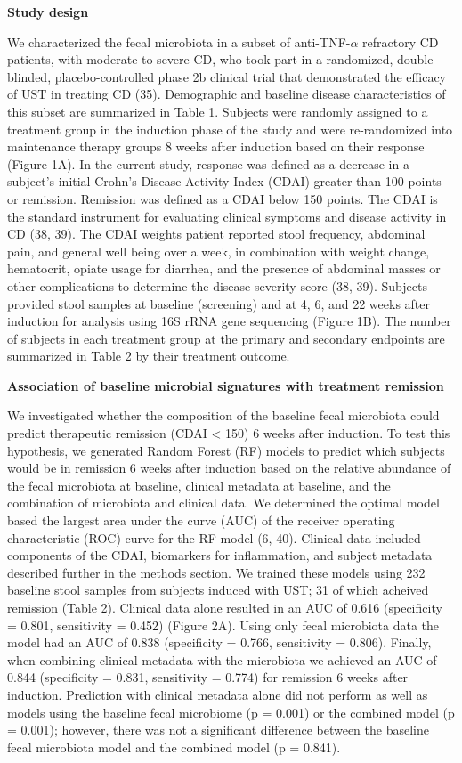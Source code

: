 \documentclass[12pt,]{article}
\begin{document}
\textbf{Study design}

We characterized the fecal microbiota in a subset of
anti-TNF-\({\alpha}\) refractory CD patients, with moderate to severe
CD, who took part in a randomized, double-blinded, placebo-controlled
phase 2b clinical trial that demonstrated the efficacy of UST in
treating CD (35). Demographic and baseline disease characteristics of
this subset are summarized in Table 1. Subjects were randomly assigned
to a treatment group in the induction phase of the study and were
re-randomized into maintenance therapy groups 8 weeks after induction
based on their response (Figure 1A). In the current study, response was
defined as a decrease in a subject's initial Crohn's Disease Activity
Index (CDAI) greater than 100 points or remission. Remission was defined
as a CDAI below 150 points. The CDAI is the standard instrument for
evaluating clinical symptoms and disease activity in CD (38, 39). The
CDAI weights patient reported stool frequency, abdominal pain, and
general well being over a week, in combination with weight change,
hematocrit, opiate usage for diarrhea, and the presence of abdominal
masses or other complications to determine the disease severity score
(38, 39). Subjects provided stool samples at baseline (screening) and at
4, 6, and 22 weeks after induction for analysis using 16S rRNA gene
sequencing (Figure 1B). The number of subjects in each treatment group
at the primary and secondary endpoints are summarized in Table 2 by
their treatment outcome.

\textbf{Association of baseline microbial signatures with treatment
remission}

We investigated whether the composition of the baseline fecal microbiota
could predict therapeutic remission (CDAI \textless{} 150) 6 weeks after
induction. To test this hypothesis, we generated Random Forest (RF)
models to predict which subjects would be in remission 6 weeks after
induction based on the relative abundance of the fecal microbiota at
baseline, clinical metadata at baseline, and the combination of
microbiota and clinical data. We determined the optimal model based the
largest area under the curve (AUC) of the receiver operating
characteristic (ROC) curve for the RF model (6, 40). Clinical data
included components of the CDAI, biomarkers for inflammation, and
subject metadata described further in the methods section. We trained
these models using 232 baseline stool samples from subjects induced with
UST; 31 of which acheived remission (Table 2). Clinical data alone
resulted in an AUC of 0.616 (specificity = 0.801, sensitivity = 0.452)
(Figure 2A). Using only fecal microbiota data the model had an AUC of
0.838 (specificity = 0.766, sensitivity = 0.806). Finally, when
combining clinical metadata with the microbiota we achieved an AUC of
0.844 (specificity = 0.831, sensitivity = 0.774) for remission 6 weeks
after induction. Prediction with clinical metadata alone did not perform
as well as models using the baseline fecal microbiome (p = 0.001) or the
combined model (p = 0.001); however, there was not a significant
difference between the baseline fecal microbiota model and the combined
model (p = 0.841).
\end{document}
